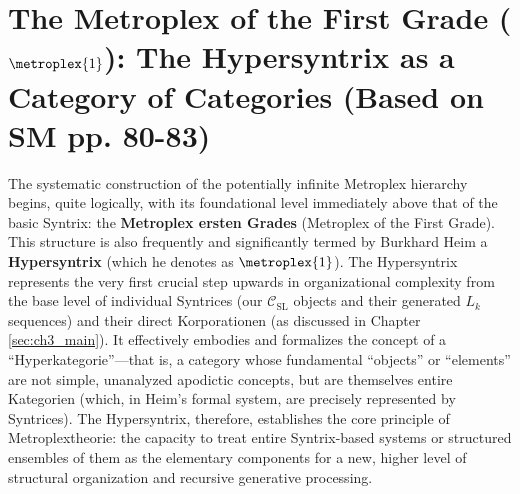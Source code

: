 \documentclass[
    12pt,              %
    a4paper,           %
    headings=normal,   %
    twoside=true,      %
    BCOR=8mm,          %
]{scrbook}
\newcommand{\q}[1]{\enquote{#1}}
\newcommand{\hypersyntrix}{\metroplex{1}}
\begin{document}
\section{The Metroplex of the First Grade (\(\hypersyntrix\)): The Hypersyntrix as a Category of Categories (Based on SM pp. 80-83)}
\label{sec:ch5_hypersyntrix_metroplex1}

The systematic construction of the potentially infinite Metroplex hierarchy begins, quite logically, with its foundational level immediately above that of the basic Syntrix: the \textbf{Metroplex ersten Grades} (Metroplex of the First Grade). This structure is also frequently and significantly termed by Burkhard Heim a \textbf{Hypersyntrix} (which he denotes as \(\hypersyntrix\)). The Hypersyntrix represents the very first crucial step upwards in organizational complexity from the base level of individual Syntrices (our \(\mathcal{C}_{\text{SL}}\) objects and their generated \(L_k\) sequences) and their direct Korporationen (as discussed in Chapter \ref{sec:ch3_main}). It effectively embodies and formalizes the concept of a \q{Hyperkategorie}—that is, a category whose fundamental \q{objects} or \q{elements} are not simple, unanalyzed apodictic concepts, but are themselves entire Kategorien (which, in Heim's formal system, are precisely represented by Syntrices). The Hypersyntrix, therefore, establishes the core principle of Metroplextheorie: the capacity to treat entire Syntrix-based systems or structured ensembles of them as the elementary components for a new, higher level of structural organization and recursive generative processing.
\end{document}
